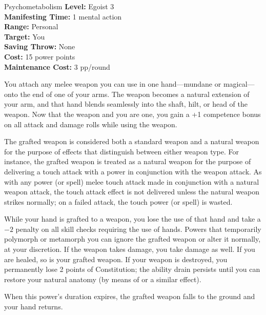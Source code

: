 {Psychometabolism}
{
	\textbf{Level:}
	Egoist 3\\
	\textbf{Manifesting Time:}
	1 mental action\\
	\textbf{Range:}
	Personal\\
	\textbf{Target:}
	You\\
	\textbf{Saving Throw:}
	None\\
	\textbf{Cost:}
	15 power points\\
	\textbf{Maintenance Cost:}
	3 pp/round\\
}
{
	You attach any melee weapon you can use in one hand---mundane or magical---onto the end of one of your arms. The weapon becomes a natural extension of your arm, and that hand blends seamlessly into the shaft, hilt, or head of the weapon. Now that the weapon and you are one, you gain a +1 competence bonus on all attack and damage rolls while using the weapon.

	The grafted weapon is considered both a standard weapon and a natural weapon for the purpose of effects that distinguish between either weapon type. For instance, the grafted weapon is treated as a natural weapon for the purpose of delivering a touch attack with a power in conjunction with the weapon attack. As with any power (or spell) melee touch attack made in conjunction with a natural weapon attack, the touch attack effect is not delivered unless the natural weapon strikes normally; on a failed attack, the touch power (or spell) is wasted.

	While your hand is grafted to a weapon, you lose the use of that hand and take a $-2$ penalty on all skill checks requiring the use of hands. Powers that temporarily polymorph or metamorph you can ignore the grafted weapon or alter it normally, at your discretion. If the weapon takes damage, you take damage as well. If you are healed, so is your grafted weapon. If your weapon is destroyed, you permanently lose 2 points of Constitution; the ability drain persists until you can restore your natural anatomy (by means of  or a similar effect).

	When this power's duration expires, the grafted weapon falls to the ground and your hand returns.
}